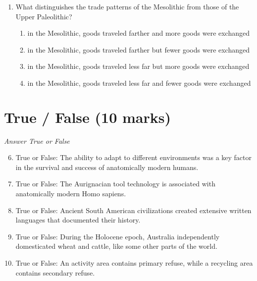 \documentclass[12pt]{article}
\begin{document}
\begin{enumerate}[label=\arabic*.]
\begin{enumerate}[label=(\alph*)]
    \item scientific creationism; human culture evolved differently than plants and animals
    \item unilineal evolution; civilizations evolved more quickly than plants
    \item natural selection; human culture did not evolve or change much over time
    \item natural selection; human culture had evolved over an enormous period of time
\end{enumerate}
\item What distinguishes the trade patterns of the Mesolithic from those of the Upper Paleolithic?
\begin{enumerate}[label=(\alph*)]
    \item in the Mesolithic, goods traveled farther and more goods were exchanged
    \item in the Mesolithic, goods traveled farther but fewer goods were exchanged
    \item in the Mesolithic, goods traveled less far but more goods were exchanged
    \item in the Mesolithic, goods traveled less far and fewer goods were exchanged
\end{enumerate}
\end{enumerate}

\section*{True / False (10 marks)}
\textit{Answer True or False}
\begin{enumerate}[label=\arabic*.]
\setcounter{enumi}{5}
\item True or False: The ability to adapt to different environments was a key factor in the survival and success of anatomically modern humans.
\item True or False: The Aurignacian tool technology is associated with anatomically modern Homo sapiens.
\item True or False: Ancient South American civilizations created extensive written languages that documented their history.
\item True or False: During the Holocene epoch, Australia independently domesticated wheat and cattle, like some other parts of the world.
\item True or False: An activity area contains primary refuse, while a recycling area contains secondary refuse.
\end{enumerate}
\end{document}
